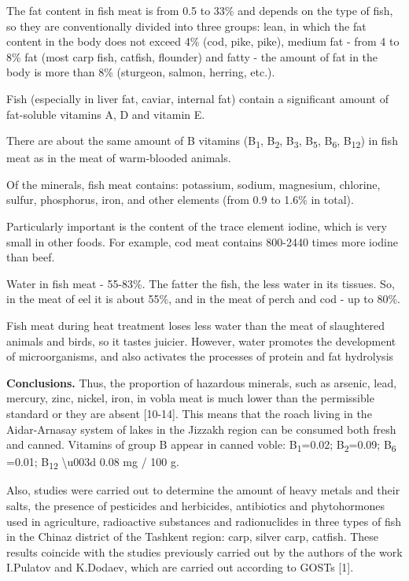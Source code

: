 \begin{multicols}{2}
The fat content in fish meat is from 0.5 to 33\% and depends on the type
of fish, so they are conventionally divided into three groups: lean, in
which the fat content in the body does not exceed 4\% (cod, pike, pike),
medium fat - from 4 to 8\% fat (most carp fish, catfish, flounder) and
fatty - the amount of fat in the body is more than 8\% (sturgeon,
salmon, herring, etc.).

Fish (especially in liver fat, caviar, internal fat) contain a
significant amount of fat-soluble vitamins A, D and vitamin E.

There are about the same amount of B vitamins (B\textsubscript{1},
B\textsubscript{2}, B\textsubscript{3}, B\textsubscript{5},
B\textsubscript{6}, B\textsubscript{12}) in fish meat as in the meat of
warm-blooded animals.

Of the minerals, fish meat contains: potassium, sodium, magnesium,
chlorine, sulfur, phosphorus, iron, and other elements (from 0.9 to
1.6\% in total).

Particularly important is the content of the trace element iodine, which
is very small in other foods. For example, cod meat contains 800-2440
times more iodine than beef.

Water in fish meat - 55-83\%. The fatter the fish, the less water in its
tissues. So, in the meat of eel it is about 55\%, and in the meat of
perch and cod - up to 80\%.

Fish meat during heat treatment loses less water than the meat of
slaughtered animals and birds, so it tastes juicier. However, water
promotes the development of microorganisms, and also activates the
processes of protein and fat hydrolysis

{\bfseries Conclusions.} Thus, the proportion of hazardous minerals, such
as arsenic, lead, mercury, zinc, nickel, iron, in vobla meat is much
lower than the permissible standard or they are absent {[}10-14{]}. This
means that the roach living in the Aidar-Arnasay system of lakes in the
Jizzakh region can be consumed both fresh and canned. Vitamins of group
B appear in canned voble: B\textsubscript{1}=0.02;
B\textsubscript{2}=0.09; B\textsubscript{6} =0.01; B\textsubscript{12}
\textbackslash u003d 0.08 mg / 100 g.

Also, studies were carried out to determine the amount of heavy metals
and their salts, the presence of pesticides and herbicides, antibiotics
and phytohormones used in agriculture, radioactive substances and
radionuclides in three types of fish in the Chinaz district of the
Tashkent region: carp, silver carp, catfish. These results coincide with
the studies previously carried out by the authors of the work I.Pulatov
and K.Dodaev, which are carried out according to GOSTs {[}1{]}.


\end{multicols}
